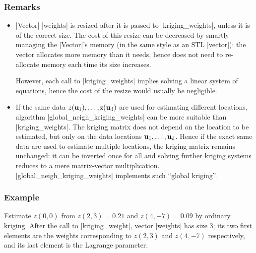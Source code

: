 \documentclass[12pt,twoside]{report}
\newcommand{\mloc}[1]{\rm{\bf #1}}
\begin{document}
\htmlrule[CLEAR=all]  \subsubsection*{Remarks}
\begin{itemize} 
\item |Vector| |weights| is resized after it is passed to |kriging_weights|, unless it is of the correct size. The cost of this resize can be decreased by smartly managing the |Vector|'s memory (in the same style as an STL |vector|): the vector allocates more memory than it needs, hence does not need to re-allocate memory each time its size increases.

 However, each call to |kriging_weights| implies solving a linear system of equations, hence the cost of the resize would usually be negligible. 

\item If the same data $z(\mloc{u}_1),\ldots,z(\mloc{u}_d)$ are used for estimating different locations, algorithm |global_neigh_kriging_weights| can be more suitable than |kriging_weights|. The kriging matrix does not depend on the location to be estimated, but only on the data locations $\mloc{u}_1,\ldots,\mloc{u}_d$. Hence if the exact same data are used to estimate multiple locations, the kriging matrix remains unchanged: it can be inverted once for all and solving further kriging systems reduces to a mere matrix-vector multiplication. |global_neigh_kriging_weights| implements such ``global kriging''.
\end{itemize}


\htmlrule[CLEAR=all]  \subsubsection*{Example}
Estimate $z(0,0)$ from $z(2,3)=0.21$ and $z(4,-7)=0.09$ by ordinary kriging. After the call to |kriging_weight|, vector |weights| has size 3; its two first elements are the weights corresponding to $z(2,3)$ and $z(4,-7)$ respectively, and its last element is the Lagrange parameter.
\end{document}

